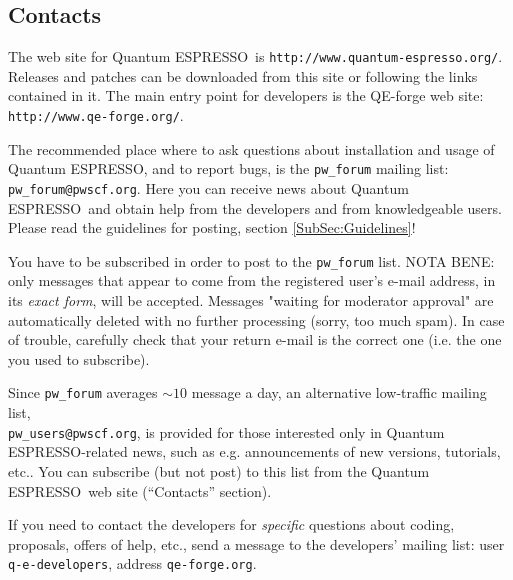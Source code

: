 \documentclass[12pt,a4paper]{article}
\def\qe{{\sc Quantum ESPRESSO}}
\begin{document}
\subsection{Contacts}
\label{SubSec:Contacts}

The web site for \qe\ is \texttt{http://www.quantum-espresso.org/}.
Releases and patches can be downloaded from this
site or following the links contained in it. The main entry point for 
developers is the QE-forge web site:
\texttt{http://www.qe-forge.org/}.

The recommended place where to ask questions about installation 
and usage of \qe, and to report bugs, is the \texttt{pw\_forum} 
mailing list: \texttt{pw\_forum@pwscf.org}. Here you can receive
news about \qe\ and obtain help from the developers and from 
knowledgeable users. Please read the guidelines for posting,
section \ref{SubSec:Guidelines}!

You have to be subscribed in order to post to the  \texttt{pw\_forum}
list. NOTA BENE: only messages that appear to come from the 
registered user's e-mail address, in its {\em exact form}, will be
accepted. Messages "waiting for moderator approval" are
automatically deleted with no further processing (sorry, too 
much spam). In case of trouble, carefully check that your return 
e-mail is the correct one (i.e. the one you used to subscribe).

Since \texttt{pw\_forum} averages $\sim 10$ message a day, an alternative
low-traffic mailing list,\\
\texttt{pw\_users@pwscf.org}, is provided for
those interested only in \qe-related news, such as e.g. announcements 
of new versions, tutorials, etc.. You can subscribe (but not post) to 
this list from the \qe\ web site (``Contacts'' section).

If you need to contact the developers for {\em specific} questions 
about coding, proposals, offers of help, etc., send a message to the
developers' mailing list: user \texttt{q-e-developers}, address
\texttt{qe-forge.org}.
\end{document}
